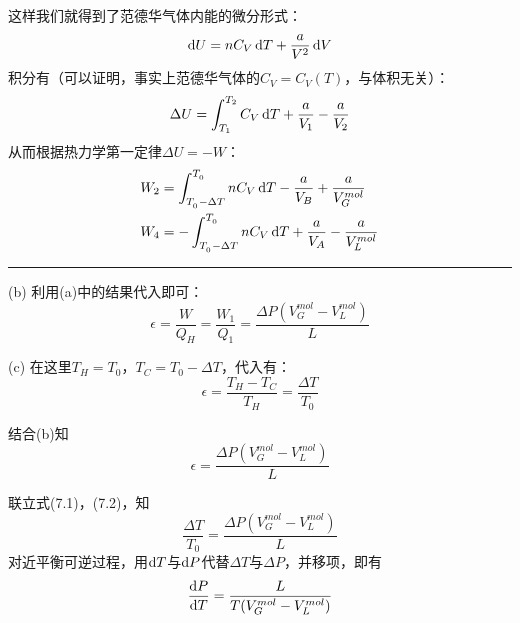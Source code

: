 \begin{solution}
{\begin{equation*}
			\end{equation*}
			这样我们就得到了范德华气体内能的微分形式：
			\begin{equation*}
				\dif U = nC_{V}\dif T + \frac{a}{V^{2}}\dif V
			\end{equation*}
			积分有（可以证明，事实上范德华气体的$C_{V} = C_{V}(T)$，与体积无关）：
			\begin{equation*}
				\Delta U = \int_{T_1}^{T_2}C_{V}\dif T + \frac{a}{V_1} - \frac{a}{V_2} 
			\end{equation*}
			从而根据热力学第一定律$\Delta U = -W$：
			\begin{equation*}
				\begin{aligned}
					& W_2 = \int_{T_{_0}-\Delta T}^{T_{_0}}nC_{V}\dif T - \frac{a}{V_{B}} + \frac{a}{V_{G}^{mol}}  \\
					& W_4 = -\int_{T_{_0}-\Delta T}^{T_{_0}}nC_{V}\dif T + \frac{a}{V_{A}} - \frac{a}{V_{L}^{mol}} 
				\end{aligned}
			\end{equation*}
			
		}
		\vspace*{1ex}		
		\hrule
        \vspace*{1ex}		
        (b) 利用(a)中的结果代入即可：
        \begin{equation*}
            \epsilon = \frac{W}{Q_H} =\frac{W_1}{Q_1}=\frac{\Delta P(V_{G}^{mol}-V_{L}^{mol})}{L}
        \end{equation*}

        (c) 在这里$T_H = T_{0}$，$T_C =T_{0} - \Delta T$，代入有：
        \begin{equation}
            \epsilon = \frac{T_H-T_C}{T_H}=\frac{\Delta T}{T_{0}}
        \end{equation}
        
        结合(b)知
        \begin{equation}
        	\epsilon = \frac{\Delta P(V_{G}^{mol}-V_{L}^{mol})}{L} 
        \end{equation}
        
        联立式(7.1)，(7.2)，知
        \[
        	\frac{\Delta T}{T_{0}}=\frac{\Delta P(V_{G}^{mol}-V_{L}^{mol})}{L} 
        \]
        对近平衡可逆过程，用$\dif T$与$\dif P$代替$\Delta T$与$\Delta P$，并移项，即有
        \begin{equation*}
            \frac{\dif{P}}{\dif{T}}=\frac{L}{T(V_{G}^{mol}-V_{L}^{mol})}
        \end{equation*}
    \end{solution}
